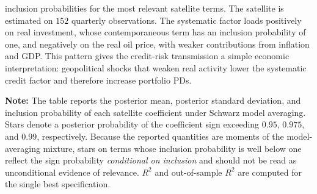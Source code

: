 inclusion probabilities for the most relevant satellite terms. The satellite
is estimated on $152$ quarterly observations. The systematic factor loads
positively on real investment, whose contemporaneous term has an inclusion
probability of one, and negatively on the real oil price, with weaker
contributions from inflation and GDP. This pattern gives the credit-risk
transmission a simple economic interpretation: geopolitical shocks that weaken
real activity lower the systematic credit factor and therefore increase
portfolio PDs.
\begin{table}[!htbp]
  \centering
  \scriptsize
  \tablestretch
  \compacttablecols
  \setlength{\tabcolsep}{6pt}
  \caption{\textbf{Model-averaged satellite for the systematic factor $Z$.}}
  \label{tab:regZ}
  \par
  \medskip
  \begin{minipage}{0.72\textwidth}
  \footnotesize
  \noindent \textbf{Note:} The table reports the posterior mean, posterior
  standard deviation, and inclusion probability of each satellite coefficient
  under Schwarz model averaging. Stars denote a posterior probability of the
  coefficient sign exceeding $0.95$, $0.975$, and $0.99$, respectively.
  Because the reported quantities are moments of the model-averaging mixture,
  stars on terms whose inclusion probability is well below one reflect the sign
  probability \emph{conditional on inclusion} and should not be read as
  unconditional evidence of relevance. $R^2$ and out-of-sample $R^2$ are
  computed for the single best specification.
  \end{minipage}
\end{table}
